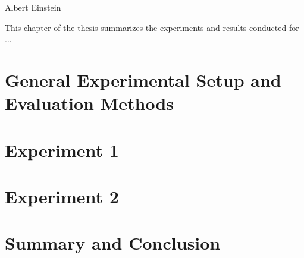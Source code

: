        {Albert Einstein}




This chapter of the thesis summarizes the experiments and results conducted for ... \todo{!}


\chapterSupportedBy{\expCitesLong}


\section{General Experimental Setup and Evaluation Methods}
\label{sec:Experimente:Setup}
%


\section{Experiment 1}
\label{sec:Experiments:Exp1}
%

\section{Experiment 2}
\label{sec:Experiments:Exp2}
%


\section{Summary and Conclusion} 
\label{sec:Experiments:Conclusion}



